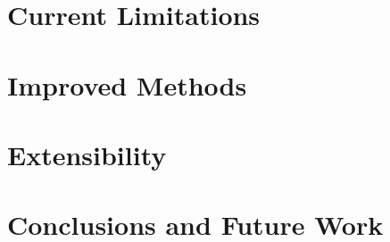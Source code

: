 \documentclass[format=sigconf]{acmart}
\begin{document}
\section{Current Limitations}

\section{Improved Methods}

\section{Extensibility}

\section{Conclusions and Future Work}



\end{document}
